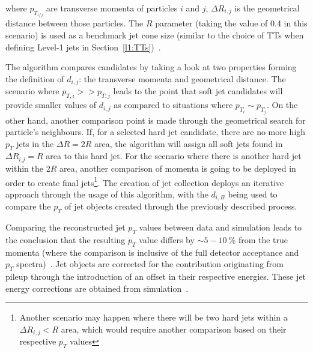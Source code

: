 where $p_{T_{i/j}}$ are transverse momenta of particles $i$ and $j$, $\Delta R_{i,j}$ is the geometrical distance between those particles. The $R$ parameter (taking the value of 0.4 in this scenario) is used as a benchmark jet cone size (similar to the choice of TTs when defining Level-1 jets in Section~\ref{l1:TTs})~\cite{note:AN_19_257}.  

\hspace{10pt} The algorithm compares candidates by taking a look at two properties forming the definition of $d_{i,j}$: the transverse momenta and geometrical distance. The scenario where $p_{T,i}>>p_{T,j}$ leads to the point that soft jet candidates will provide smaller values of $d_{i,j}$ as compared to situations where $p_{T_i}\sim p_{T_j}$. On the other hand, another comparison point is made through the geometrical search for particle's neighbours. If, for a selected hard jet candidate, there are no more high $p_T$ jets in the $\Delta R = 2R$ area, the algorithm will assign all soft jets found in $\Delta R_{i.j} = R$ area to this hard jet. For the scenario where there is another hard jet within the $2R$ area, another comparison of momenta is going to be deployed in order to create final jets\footnote{Another scenario may happen where there will be two hard jets within a $\Delta R_{i,j}< R$ area, which would require another comparison based on their respective $p_T$ values}. The creation of jet collection deploys an iterative approach through the usage of this algorithm, with the $d_{i,B}$ being used to compare the $p_T$ of jet objects created through the previously described process.

\hspace{10pt} Comparing the reconstructed jet $p_T$ values between data and simulation leads to the conclusion that the resulting $p_T$ value differs by $\sim 5-10~$\% from the true momenta (where the comparison is inclusive of the full detector acceptance and $p_T$ spectra)~\cite{note:AN_19_257}. Jet objects are corrected for the contribution originating from pileup through the introduction of an offset in their respective energies. These jet energy corrections are obtained from simulation~\cite{note:AN_19_257,paper_jes_jer,twiki_jes_jer}.

